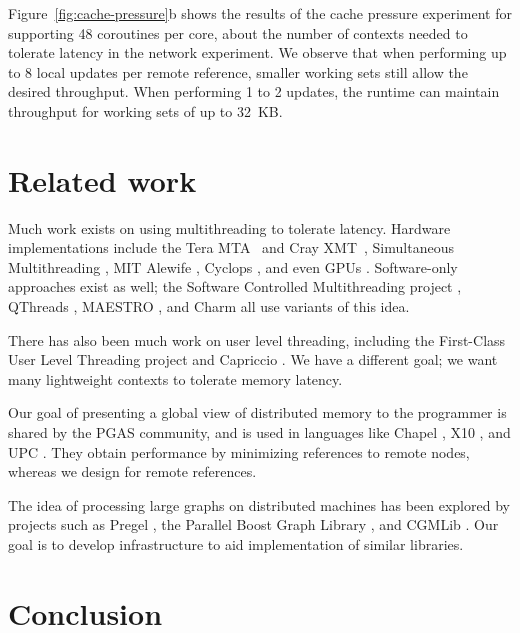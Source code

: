 \documentclass[10pt,nocopyrightspace]{sigplanconf}
\newcommand{\mrps}[1]{\unit[#1]{Mref/s}}
\begin{document}
Figure~\ref{fig:cache-pressure}b shows the results of the cache pressure experiment for supporting 48 coroutines per core, about the number of contexts needed to tolerate latency in the network experiment. We observe that when performing up to 8 local updates per remote reference, smaller working sets still allow the desired throughput. When performing 1 to 2 updates, the runtime can maintain throughput for working sets of up to 32~KB.



\section{Related work}
\label{sec:related}


Much work exists on using multithreading to tolerate latency. Hardware
implementations include the Tera MTA~\cite{tera} and Cray
{\small XMT}~\cite{feo-xmt}, Simultaneous Multithreading \cite{tullsen-smt},
MIT Alewife \cite{agarwal-alewife}, Cyclops \cite{almasi-cyclops}, and
even GPUs \cite{gpus}. Software-only approaches exist as well; the
Software Controlled Multithreading project \cite{mowry-scm}, QThreads
\cite{qthreads}, MAESTRO \cite{maestro}, and Charm \cite{charm} all
use variants of this idea.

There has also been much work on user level threading, including the First-Class
User Level Threading project \cite{ult} and Capriccio \cite{capriccio}. We have a
different goal; we want many lightweight contexts to tolerate memory
latency.

Our goal of presenting a global view of distributed memory to the
programmer is shared by the PGAS community, and is used in languages
like Chapel \cite{chapel}, X10 \cite{X10}, and UPC \cite{upc}. They
obtain performance by minimizing references to remote nodes, whereas we
design for remote references.

The idea of processing large graphs on distributed machines has been
explored by projects such as Pregel \cite{pregel}, the Parallel Boost
Graph Library \cite{parallelbgl}, and CGMLib \cite{cgmlib}. Our goal
is to develop infrastructure to aid implementation of similar
libraries.

\section{Conclusion}
\label{sec:conclusion}
\end{document}
